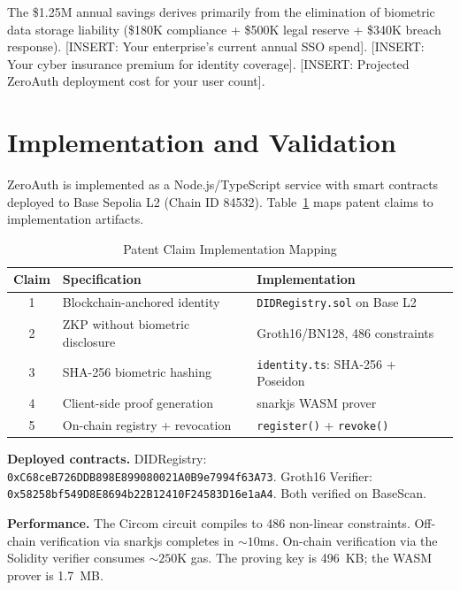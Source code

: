 \documentclass[journal, letterpaper, 10pt]{IEEEtran}
\newcommand{\placeholder}[1]{\textsf{\small\color{red!70!black}[#1]}}
\begin{document}
The \$1.25M annual savings derives primarily from the elimination of biometric data storage liability (\$180K compliance + \$500K legal reserve + \$340K breach response). \placeholder{INSERT: Your enterprise's current annual SSO spend}. \placeholder{INSERT: Your cyber insurance premium for identity coverage}. \placeholder{INSERT: Projected ZeroAuth deployment cost for your user count}.

\section{Implementation and Validation}
\label{sec:implementation}

ZeroAuth is implemented as a Node.js/TypeScript service with smart contracts deployed to Base Sepolia L2 (Chain ID 84532). Table~\ref{tab:patent} maps patent claims to implementation artifacts.

\begin{table}[h]
\centering
\caption{Patent Claim Implementation Mapping}
\label{tab:patent}
\footnotesize
\begin{tabularx}{\columnwidth}{@{}clX@{}}
\toprule
\textbf{Claim} & \textbf{Specification} & \textbf{Implementation} \\
\midrule
1 & Blockchain-anchored identity & \texttt{DIDRegistry.sol} on Base L2 \\
2 & ZKP without biometric disclosure & Groth16/BN128, 486 constraints \\
3 & SHA-256 biometric hashing & \texttt{identity.ts}: SHA-256 + Poseidon \\
4 & Client-side proof generation & snarkjs WASM prover \\
5 & On-chain registry + revocation & \texttt{register()} + \texttt{revoke()} \\
\bottomrule
\end{tabularx}
\end{table}

\textbf{Deployed contracts.} DIDRegistry: \texttt{0xC68ceB726DDB898\allowbreak{}E899080021A0B9e7994f63A73}. Groth16 Verifier: \texttt{0x58258bf549D8E8694b22B12410F24\allowbreak{}583D16e1aA4}. Both verified on BaseScan.

\textbf{Performance.} The Circom circuit compiles to 486 non-linear constraints. Off-chain verification via snarkjs completes in ${\sim}10$ms. On-chain verification via the Solidity verifier consumes ${\sim}250$K gas. The proving key is 496~KB; the WASM prover is 1.7~MB.
\end{document}
